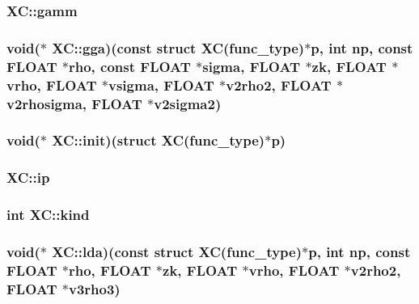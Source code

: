 \hypertarget{struct_x_c_ad43c080cd87eb8afee658e24af711d9d}{
\subsubsection[{gamm}]{ X\-C\-::gamm}}\label{struct_x_c_ad43c080cd87eb8afee658e24af711d9d}
\hypertarget{struct_x_c_a922dca4919617234ca0750c874decf99}{
\subsubsection[{gga}]{\setlength{\rightskip}{0pt plus 5cm}void($\ast$ X\-C\-::gga)(const struct {\bf X\-C}(func\-\_\-type)$\ast$p, int np, const {\bf F\-L\-O\-A\-T} $\ast${\bf rho}, const {\bf F\-L\-O\-A\-T} $\ast$sigma, {\bf F\-L\-O\-A\-T} $\ast$zk, {\bf F\-L\-O\-A\-T} $\ast$vrho, {\bf F\-L\-O\-A\-T} $\ast$vsigma, {\bf F\-L\-O\-A\-T} $\ast$v2rho2, {\bf F\-L\-O\-A\-T} $\ast$v2rhosigma, {\bf F\-L\-O\-A\-T} $\ast$v2sigma2)}}\label{struct_x_c_a922dca4919617234ca0750c874decf99}
\hypertarget{struct_x_c_a05765744608dd711f4872fcd87db6e77}{
\subsubsection[{init}]{\setlength{\rightskip}{0pt plus 5cm}void($\ast$ X\-C\-::init)(struct {\bf X\-C}(func\-\_\-type)$\ast$p)}}\label{struct_x_c_a05765744608dd711f4872fcd87db6e77}
\hypertarget{struct_x_c_a653511a4d86587c8b42c5999ddf9fb15}{
\subsubsection[{ip}]{ X\-C\-::ip}}\label{struct_x_c_a653511a4d86587c8b42c5999ddf9fb15}
\hypertarget{struct_x_c_a3f5c7fb8208a95684d62df96f5d191be}{
\subsubsection[{kind}]{\setlength{\rightskip}{0pt plus 5cm}int X\-C\-::kind}}\label{struct_x_c_a3f5c7fb8208a95684d62df96f5d191be}
\hypertarget{struct_x_c_aa3c3b6074412338afac276b03c238e43}{
\subsubsection[{lda}]{\setlength{\rightskip}{0pt plus 5cm}void($\ast$ X\-C\-::lda)(const struct {\bf X\-C}(func\-\_\-type)$\ast$p, int np, const {\bf F\-L\-O\-A\-T} $\ast${\bf rho}, {\bf F\-L\-O\-A\-T} $\ast$zk, {\bf F\-L\-O\-A\-T} $\ast$vrho, {\bf F\-L\-O\-A\-T} $\ast$v2rho2, {\bf F\-L\-O\-A\-T} $\ast$v3rho3)}}\label{struct_x_c_aa3c3b6074412338afac276b03c238e43}
